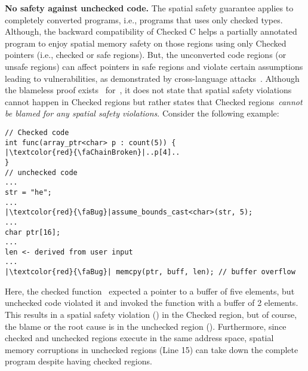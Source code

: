\iffalse
\noindent
\textbf{No safety against unchecked code.} The \checkedc spatial safety guarantee applies to completely converted programs, i.e., programs that uses only checked types.
Although, the backward compatibility of Checked C helps a partially annotated program to enjoy spatial memory safety on those regions using only Checked pointers (i.e., checked or safe regions).
But, the unconverted code regions (or unsafe regions) can affect pointers in safe regions and violate certain assumptions leading to vulnerabilities, as demonstrated by cross-language attacks~\cite{mergendahlcross}.
Although the blameless proof exists~\cite{ruef2019achieving} for~\checkedc, it does not state that spatial safety violations cannot happen in Checked regions but rather states that Checked regions~\emph{cannot be blamed for any spatial safety violations}.
Consider the following example:
\begin{verbatim}
// Checked code
int func(array_ptr<char> p : count(5)) {
|\textcolor{red}{\faChainBroken}|..p[4]..
}
// unchecked code
...
str = "he";
...
|\textcolor{red}{\faBug}|assume_bounds_cast<char>(str, 5); 
...
char ptr[16];
...
len <- derived from user input
...
|\textcolor{red}{\faBug}| memcpy(ptr, buff, len); // buffer overflow
\end{verbatim}
Here, the checked function~ expected a pointer to a buffer of five elements, but unchecked code violated it and invoked the function with a buffer of 2 elements.
This results in a spatial safety violation (\textcolor{red}{\faChainBroken}) in the Checked region, but of course, the blame or the root cause is in the unchecked region (\textcolor{red}{\faBug}).
Furthermore, since checked and unchecked regions execute in the same address space, spatial memory corruptions in unchecked regions (Line 15) can take down the complete program despite having checked regions.
